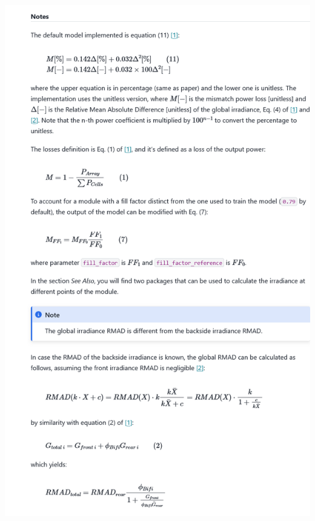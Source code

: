 \begin{myparindent}{0pt}
\includegraphics[width=\linewidth,height=0.9\textheight,keepaspectratio]{images/docs_funcs_cut/power_mismatch_deline_1.png}


\end{myparindent}
